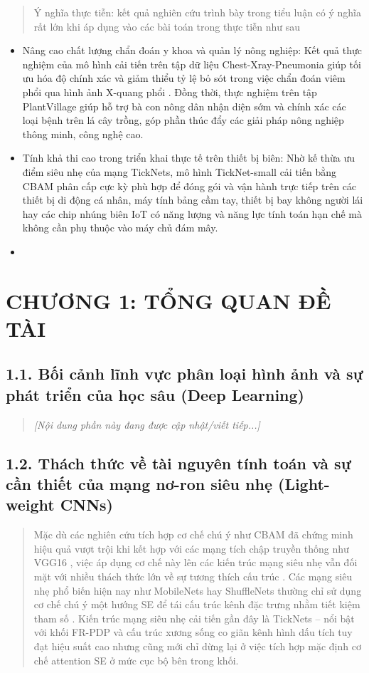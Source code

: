 \documentclass[
]{article}
\begin{document}
\begin{quote}
Ý nghĩa thực tiễn: kết quả nghiên cứu trình bày trong tiểu luận có ý
nghĩa rất lớn khi áp dụng vào các bài toán trong thực tiễn như sau
\end{quote}

\begin{itemize}
\item
  Nâng cao chất lượng chẩn đoán y khoa và quản lý nông nghiệp: Kết quả
  thực nghiệm của mô hình cải tiến trên tập dữ liệu Chest-Xray-Pneumonia
  giúp tối ưu hóa độ chính xác và giảm thiểu tỷ lệ bỏ sót trong việc
  chẩn đoán viêm phổi qua hình ảnh X-quang phổi . Đồng thời, thực nghiệm
  trên tập PlantVillage giúp hỗ trợ bà con nông dân nhận diện sớm và
  chính xác các loại bệnh trên lá cây trồng, góp phần thúc đẩy các giải
  pháp nông nghiệp thông minh, công nghệ cao.
\item
  Tính khả thi cao trong triển khai thực tế trên thiết bị biên: Nhờ kế
  thừa ưu điểm siêu nhẹ của mạng TickNets, mô hình TickNet-small cải
  tiến bằng CBAM phân cấp cực kỳ phù hợp để đóng gói và vận hành trực
  tiếp trên các thiết bị di động cá nhân, máy tính bảng cầm tay, thiết
  bị bay không người lái hay các chip nhúng biên IoT có năng lượng và
  năng lực tính toán hạn chế mà không cần phụ thuộc vào máy chủ đám mây.
\item
\end{itemize}

\section{CHƯƠNG 1: TỔNG QUAN ĐỀ TÀI}\label{chux1b0ux1a1ng-1-tux1ed5ng-quan-ux111ux1ec1-tuxe0i}

\subsection{1.1. Bối cảnh lĩnh vực phân loại hình ảnh và sự phát triển của học sâu (Deep Learning)}\label{ch1-1-bg}
\begin{quote}
\emph{[Nội dung phần này đang được cập nhật/viết tiếp...]}
\end{quote}

\subsection{1.2. Thách thức về tài nguyên tính toán và sự cần thiết của mạng nơ-ron siêu nhẹ (Light-weight CNNs)}\label{ch1-2-lightweight}
\begin{quote}
Mặc dù các nghiên cứu tích hợp cơ chế chú ý như CBAM đã chứng minh hiệu
quả vượt trội khi kết hợp với các mạng tích chập truyền thống như VGG16
, việc áp dụng cơ chế này lên các kiến trúc mạng siêu nhẹ vẫn đối mặt
với nhiều thách thức lớn về sự tương thích cấu trúc . Các mạng siêu nhẹ
phổ biến hiện nay như MobileNets hay ShuffleNets thường chỉ sử dụng cơ
chế chú ý một hướng SE để tái cấu trúc kênh đặc trưng nhằm tiết kiệm
tham số . Kiến trúc mạng siêu nhẹ cải tiến gần đây là TickNets -- nổi
bật với khối FR-PDP và cấu trúc xương sống co giãn kênh hình dấu tích
tuy đạt hiệu suất cao nhưng cũng mới chỉ dừng lại ở việc tích hợp mặc
định cơ chế attention SE ở mức cục bộ bên trong khối.
\end{quote}
\end{document}
